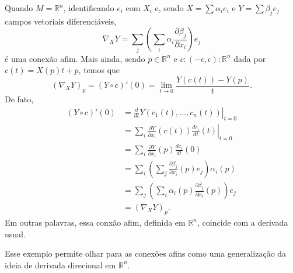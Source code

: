 \begin{example}
	\label{ex:conexao-afim}
	Quando $M=\mathbb{R}^{n}$, identificando $e_{i}$ com $X_{i}$ e, sendo $X = \sum\alpha_{i}e_{i}$ e $Y=\sum\beta_{j}e_{j}$ campos vetoriais diferenciáveis,
	\begin{equation*}
		\nabla_{X}Y=\sum_{j}\left( \sum_{i}\alpha_{i}\frac{\partial\beta_{j}}{\partial x_{i}} \right)e_{j}
	\end{equation*}
	é uma conexão afim. Mais ainda, sendo $p \in \mathbb{R}^{n}$ e $c:(-\epsilon,\epsilon):\mathbb{R}^{n}$ dada por $c(t)=X(p)t+p$, temos que
	\begin{equation*}
		(\nabla _{X}Y)_{p}=(Y \circ c)'(0)=\lim_{ t \to 0 } \frac{Y(c(t))-Y(p)}{t}.
	\end{equation*}
	De fato,
	\begin{align*}
		(Y \circ c)'(0) & = \left. \frac{d}{dt} Y(c_1(t), \dots, c_n(t)) \right|_{t=0}                            \\
		                & = \left. \sum_i \frac{\partial Y}{\partial x_i}(c(t)) \frac{dc_i}{dt}(t) \right|_{t=0}  \\
		                & = \sum_i \frac{\partial Y}{\partial x_i}(p) \frac{dc_i}{dt}(0)                          \\
		                & = \sum_i \left( \sum_j \frac{\partial \beta_j}{\partial x_i}(p) e_j \right) \alpha_i(p) \\
		                & = \sum_j \left( \sum_i \alpha_i(p) \frac{\partial \beta_j}{\partial x_i}(p) \right) e_j \\
		                & = (\nabla_{X}Y)_{p}.
	\end{align*}
	Em outras palavras, essa conxão afim, definida em $\mathbb{R}^{n}$, coincide com a derivada usual.
\end{example}
Esse exemplo permite olhar para as conexões afins como uma generalização da ideia de derivada direcional em $\mathbb{R}^{n}$.


